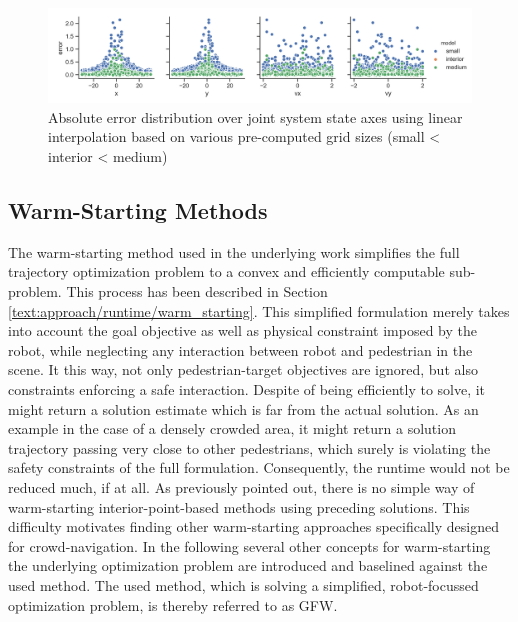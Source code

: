 \begin{figure}[!ht]
\begin{center}
\includegraphics[width=\imgwidth]{images/hj_hist_linear.png}
\caption{Absolute error distribution over joint system state axes using linear interpolation based on various pre-computed grid sizes (small < interior < medium)}
\label{img:hj_approx_hist}
\end{center}
\end{figure}

\subsection{Warm-Starting Methods}
The warm-starting method used in the underlying work simplifies the full trajectory optimization problem to a convex and efficiently computable sub-problem. This process has been described in Section \ref{text:approach/runtime/warm_starting}. This simplified formulation merely takes into account the goal objective as well as physical constraint imposed by the robot, while neglecting any interaction between robot and pedestrian in the scene. It this way, not only pedestrian-target objectives are ignored, but also constraints enforcing a safe interaction. Despite of being efficiently to solve, it might return a solution estimate which is far from the actual solution. As an example in the case of a densely crowded area, it might return a solution trajectory passing very close to other pedestrians, which surely is violating the safety constraints of the full formulation. Consequently, the runtime would not be reduced much, if at all. 
\newline
As previously pointed out, there is no simple way of warm-starting interior-point-based methods using preceding solutions. This difficulty motivates finding other warm-starting approaches specifically designed for crowd-navigation. In the following several other concepts for warm-starting the underlying optimization problem are introduced and baselined against the used method. The used method, which is solving a simplified, robot-focussed optimization problem, is thereby referred to as \ac{GFW}.

